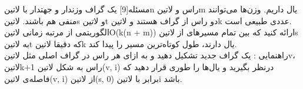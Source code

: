 
‌مسئله[9]
یک گراف وزندار و جهتدار با ‌لاتین{n} راس و ‌لاتین{m} یال داریم. وزن‌ها می‌توانند منفی هم باشند. ‌لاتین{s} و ‌لاتین{t} دو راس از گراف هستند و ‌لاتین{k} عددی طبیعی است. 
\\الگوریتمی از مرتبه زمانی ‌لاتین{O(k(n + m))} ارائه کنید که بین تمام مسیرهای از ‌لاتین{s} به ‌لاتین{t} که دقیقا ‌لاتین{k} یال دارند، طول کوتاه‌ترین مسیر را پیدا کند.
\\راهنمایی : یک گراف جدید تشکیل دهید و به ازای هر راس در گراف اصلی مثل ‌لاتین{v}، ‌لاتین{k+1} راس به شکل ‌لاتین{(v, i)} درنظر بگیرید و یال‌ها را طوری قرار دهید که فاصله‌ی ‌لاتین{(v, i)} از ‌لاتین{(s, 0)} برابر با ‌لاتین{i} باشد. 


